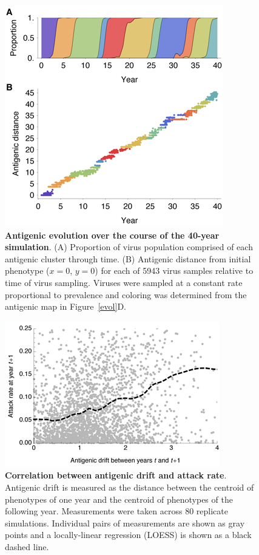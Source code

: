 \documentclass[11pt,oneside,letterpaper]{article}
\begin{document}
\vspace*{\fill}
\begin{figure}[H]
	\centering
	\includegraphics{figures/phenotypes}
	\caption{\textbf{Antigenic evolution over the course of the 40-year simulation}. (A) Proportion of virus population comprised of each antigenic cluster through time.  (B) Antigenic distance from initial phenotype ($x=0$, $y=0$) for each of 5943 virus samples relative to time of virus sampling.  Viruses were sampled at a constant rate proportional to prevalence and coloring was determined from the antigenic map in Figure~\ref{evol}D.}
	\label{phenotypes}
\end{figure}
\vspace*{\fill}

\pagebreak

\vspace*{\fill}
\begin{figure}[H]
	\centering
	\includegraphics{figures/driftvsinc}
	\caption{\textbf{Correlation between antigenic drift and attack rate}. Antigenic drift is measured as the distance between the centroid of phenotypes of one year and the centroid of phenotypes of the following year.  Measurements were taken across 80 replicate simulations.  Individual pairs of measurements are shown as gray points and a locally-linear regression (LOESS) is shown as a black dashed line.}
	\label{driftvsinc}
\end{figure}
\vspace*{\fill}
\end{document}
